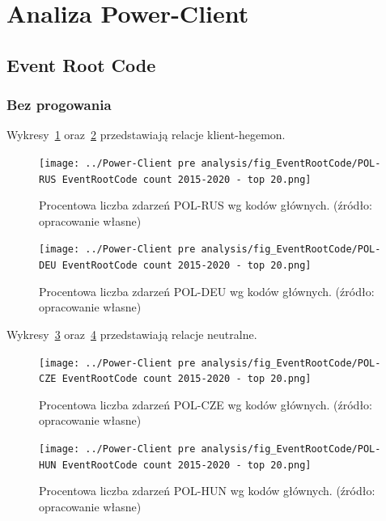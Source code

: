\documentclass[11pt]{report}
\begin{document}
    \section{Analiza Power-Client}

    \subsection{Event Root Code}

    \subsubsection{Bez progowania}\label{subsubsec:erc:bez-progowania}

    Wykresy~\ref{fig:Power-Client:ERC:POL-RUS} oraz~\ref{fig:Power-Client:ERC:POL-DEU} przedstawiają relacje klient-hegemon.

    \begin{figure}[tp]
        \centering
        \texttt{[image: ../Power-Client pre analysis/fig\_EventRootCode/POL-RUS EventRootCode count 2015-2020 - top 20.png]}
        \caption{Procentowa liczba zdarzeń POL-RUS wg kodów głównych. (źródło: opracowanie własne)}
        \label{fig:Power-Client:ERC:POL-RUS}
    \end{figure}

    \begin{figure}[tp]
        \centering
        \texttt{[image: ../Power-Client pre analysis/fig\_EventRootCode/POL-DEU EventRootCode count 2015-2020 - top 20.png]}
        \caption{Procentowa liczba zdarzeń POL-DEU wg kodów głównych. (źródło: opracowanie własne)}
        \label{fig:Power-Client:ERC:POL-DEU}
    \end{figure}

    Wykresy~\ref{fig:Power-Client:ERC:POL-CZE} oraz~\ref{fig:Power-Client:ERC:POL-HUN} przedstawiają relacje neutralne.

    \begin{figure}[tp]
        \centering
        \texttt{[image: ../Power-Client pre analysis/fig\_EventRootCode/POL-CZE EventRootCode count 2015-2020 - top 20.png]}
        \caption{Procentowa liczba zdarzeń POL-CZE wg kodów głównych. (źródło: opracowanie własne)}
        \label{fig:Power-Client:ERC:POL-CZE}
    \end{figure}

    \begin{figure}[tp]
        \centering
        \texttt{[image: ../Power-Client pre analysis/fig\_EventRootCode/POL-HUN EventRootCode count 2015-2020 - top 20.png]}
        \caption{Procentowa liczba zdarzeń POL-HUN wg kodów głównych. (źródło: opracowanie własne)}
        \label{fig:Power-Client:ERC:POL-HUN}
    \end{figure}
\end{document}
